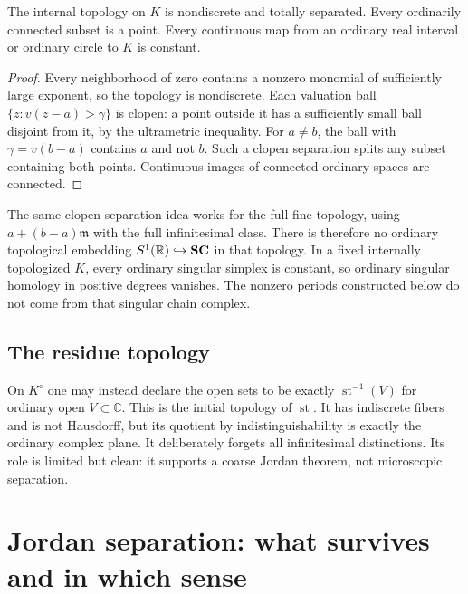 \documentclass[11pt,letterpaper]{article}
\theoremstyle{definition}
\theoremstyle{remark}
\newcommand{\R}{\mathbb R}\newcommand{\C}{\mathbb C}\newcommand{\Q}{\mathbb Q}
\newcommand{\m}{\mathfrak m}\newcommand{\st}{\operatorname{st}}
\numberwithin{equation}{section}
\begin{document}
\begin{proposition}\label{prop:internal}
The internal topology on $K$ is nondiscrete and totally separated. Every ordinarily connected subset is a point. Every continuous map from an ordinary real interval or ordinary circle to $K$ is constant.
\end{proposition}
\begin{proof}
Every neighborhood of zero contains a nonzero monomial of sufficiently large exponent, so the topology is nondiscrete. Each valuation ball $\{z:v(z-a)>\gamma\}$ is clopen: a point outside it has a sufficiently small ball disjoint from it, by the ultrametric inequality. For $a\ne b$, the ball with $\gamma=v(b-a)$ contains $a$ and not $b$. Such a clopen separation splits any subset containing both points. Continuous images of connected ordinary spaces are connected.
\end{proof}

The same clopen separation idea works for the full fine topology, using $a+(b-a)\m$ with the full infinitesimal class. There is therefore no ordinary topological embedding $S^1(\R)\hookrightarrow\SC$ in that topology. In a fixed internally topologized $K$, every ordinary singular simplex is constant, so ordinary singular homology in positive degrees vanishes. The nonzero periods constructed below do not come from that singular chain complex.

\subsection{The residue topology}
On $K^\circ$ one may instead declare the open sets to be exactly $\st^{-1}(V)$ for ordinary open $V\subset\C$. This is the initial topology of $\st$. It has indiscrete fibers and is not Hausdorff, but its quotient by indistinguishability is exactly the ordinary complex plane. It deliberately forgets all infinitesimal distinctions. Its role is limited but clean: it supports a coarse Jordan theorem, not microscopic separation.

\section{Jordan separation: what survives and in which sense}\label{sec:jordan}
\end{document}
